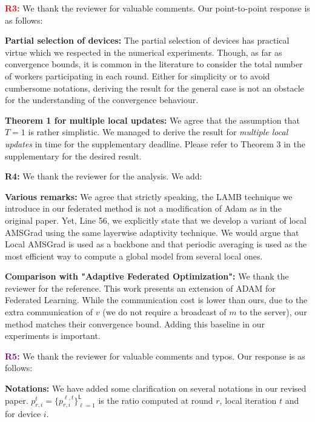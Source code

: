 \documentclass{article}
\begin{document}
\textbf{\textcolor{red}{R3:}} We thank the reviewer for valuable comments.  Our point-to-point response is as follows: \vspace{-4pt}


\textbf{Partial selection of devices:} The partial selection of devices has practical virtue which we respected in the numerical experiments.
Though, as far as convergence bounds, it is common in the literature to consider the total number of workers participating in each round.
Either for simplicity or to avoid cumbersome notations, deriving the result for the general case is not an obstacle for the understanding of the convergence behaviour.

\vspace{-2pt}
\textbf{Theorem 1 for multiple local updates:} 
We agree that the assumption that $T =1$ is rather simplistic.
We managed to derive the result for \emph{multiple local updates} in time for the supplementary deadline.
Please refer to Theorem 3 in the supplementary for the desired result.
 

\textbf{\textcolor{green!50!black}{R4:}} We thank the reviewer for the analysis. We add: \vspace{-4pt}

\textbf{Various remarks:}
We agree that strictly speaking, the LAMB technique we introduce in our federated method is not a modification of Adam as in the original paper.
Yet, Line 56, we explicitly state that we develop a variant of local AMSGrad using the same layerwise adaptivity technique.
We would argue that Local AMSGrad is used as a backbone and that periodic averaging is used as the most efficient way to compute a global model from several local ones.

\vspace{-2pt}
\textbf{Comparison with "Adaptive Federated Optimization":} 
We thank the reviewer for the reference.
This work presents an extension of ADAM for Federated Learning.
While the communication cost is lower than ours, due to the extra communication of $v$ (we do not require a broadcast of $m$ to the server), our method matches their convergence bound.
Adding this baseline in our experiments is important.


\textbf{\textcolor{purple}{R5:}} We thank the reviewer for valuable comments and typos. Our response is as follows: \vspace{-4pt}


\textbf{Notations:} We have added some clarification on several notations in our revised paper. 
$p_{r,i}^{t} = \{p_{r,i}^{\ell,t}\}_{\ell=1}^{\mathsf{L}}$ is the ratio computed at round $r$, local iteration $t$ and for device $i$.
\end{document}
